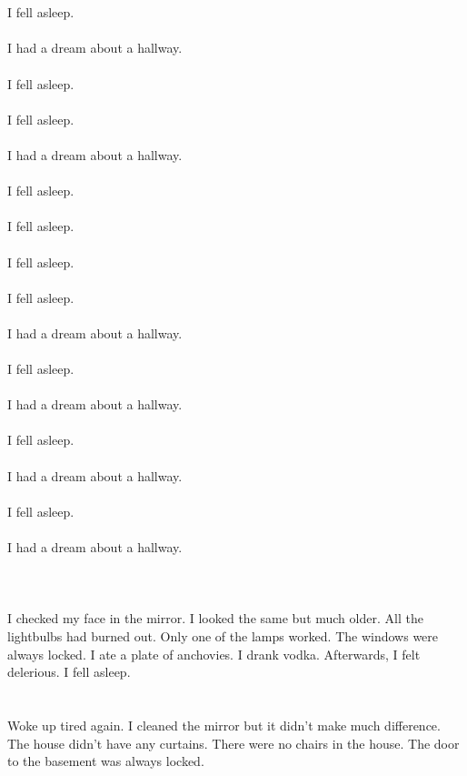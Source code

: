 \documentclass{article}
\begin{document}
    \section{}
    I fell asleep.\\\\I had a dream about a hallway.\\\\ I fell asleep.\\\\ I fell asleep.\\\\I had a dream about a hallway.\\\\ I fell asleep.\\\\ I fell asleep.\\\\ I fell asleep.\\\\ I fell asleep.\\\\I had a dream about a hallway.\\\\ I fell asleep.\\\\I had a dream about a hallway.\\\\ I fell asleep.\\\\I had a dream about a hallway.\\\\ I fell asleep.\\\\I had a dream about a hallway.\\\\ 
    \newpage
    
    \section{}
    I checked my face in the mirror. I looked the same but much older. All the lightbulbs had burned out. Only one of the lamps worked. The windows were always locked. I ate a plate of anchovies. I drank vodka. Afterwards, I felt delerious. I fell asleep.  
    \newpage
    
    \section{}
    Woke up tired again. I cleaned the mirror but it didn't make much difference. The house didn't have any curtains. There were no chairs in the house. The door to the basement was always locked.  
    \newpage
    
\end{document}
